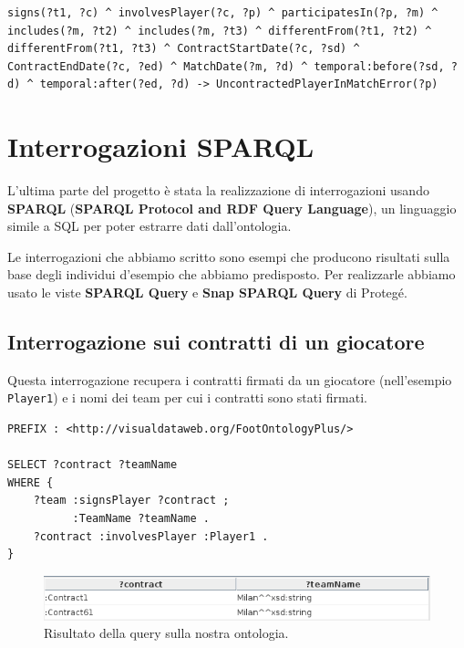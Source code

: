 \documentclass[11pt]{report} %
\begin{document}
\begin{lstlisting}[language=SWRL]
signs(?t1, ?c) ^ involvesPlayer(?c, ?p) ^ participatesIn(?p, ?m) ^ includes(?m, ?t2) ^ includes(?m, ?t3) ^ differentFrom(?t1, ?t2) ^ differentFrom(?t1, ?t3) ^ ContractStartDate(?c, ?sd) ^ ContractEndDate(?c, ?ed) ^ MatchDate(?m, ?d) ^ temporal:before(?sd, ?d) ^ temporal:after(?ed, ?d) -> UncontractedPlayerInMatchError(?p)
\end{lstlisting}

\chapter{Interrogazioni SPARQL}

L'ultima parte del progetto è stata la realizzazione di interrogazioni usando \textbf{SPARQL} (\textbf{SPARQL Protocol and RDF Query Language}), un linguaggio simile a SQL per poter estrarre dati dall'ontologia.

\hfill

Le interrogazioni che abbiamo scritto sono esempi che producono risultati sulla base degli individui d'esempio che abbiamo predisposto. 
Per realizzarle abbiamo usato le viste \textbf{SPARQL Query} e \textbf{Snap SPARQL Query} di Protegé. 

\section{Interrogazione sui contratti di un giocatore}

Questa interrogazione recupera i contratti firmati da un giocatore (nell'esempio \texttt{Player1}) e i nomi dei team per cui i contratti sono stati firmati. 

\begin{lstlisting}
PREFIX : <http://visualdataweb.org/FootOntologyPlus/>

SELECT ?contract ?teamName
WHERE { 
    ?team :signsPlayer ?contract ;
          :TeamName ?teamName .
    ?contract :involvesPlayer :Player1 .
}
\end{lstlisting}

\begin{figure}[H]
	\includegraphics[width=\textwidth]{query1}
	\caption{Risultato della query sulla nostra ontologia.}
\end{figure}
\end{document}
